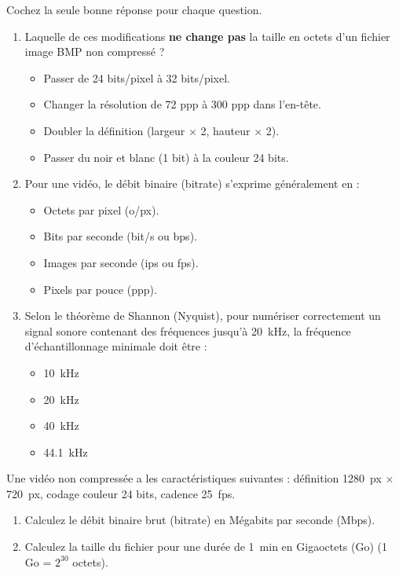 \documentclass[11pt]{article}
\begin{document}
\begin{exercice}
Cochez la seule bonne réponse pour chaque question.
\begin{enumerate}
    \item Laquelle de ces modifications \textbf{ne change pas} la taille en octets d'un fichier image BMP non compressé ?
    \begin{itemize}
        \item[A] Passer de 24 bits/pixel à 32 bits/pixel.
        \item[B] Changer la résolution de 72 ppp à 300 ppp dans l'en-tête.
        \item[C] Doubler la définition (largeur $\times$ 2, hauteur $\times$ 2).
        \item[D] Passer du noir et blanc (1 bit) à la couleur 24 bits.
    \end{itemize}
    \item Pour une vidéo, le débit binaire (bitrate) s'exprime généralement en :
    \begin{itemize}
        \item[A] Octets par pixel (o/px).
        \item[B] Bits par seconde (bit/s ou bps).
        \item[C] Images par seconde (ips ou fps).
        \item[D] Pixels par pouce (ppp).
    \end{itemize}
    \item Selon le théorème de Shannon (Nyquist), pour numériser correctement un signal sonore contenant des fréquences jusqu'à \SI{20}{\kilo\hertz}, la fréquence d'échantillonnage minimale doit être :
    \begin{itemize}
        \item[A] \SI{10}{\kilo\hertz}
        \item[B] \SI{20}{\kilo\hertz}
        \item[C] \SI{40}{\kilo\hertz}
        \item[D] \SI{44,1}{\kilo\hertz}
    \end{itemize}
\end{enumerate}
\end{exercice}

\begin{exercice}
Une vidéo non compressée a les caractéristiques suivantes : définition \SI{1280}{px} $\times$ \SI{720}{px}, codage couleur 24 bits, cadence \SI{25}{fps}.
\begin{enumerate}
    \item Calculez le débit binaire brut (bitrate) en Mégabits par seconde (Mbps).
    \item Calculez la taille du fichier pour une durée de \SI{1}{\minute} en Gigaoctets (Go) (1 Go = $2^{30}$ octets).
\end{enumerate}
\end{exercice}
\end{document}
